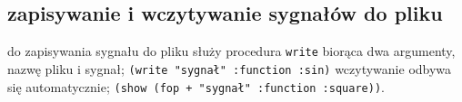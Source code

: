 \documentclass[12pt]{article}
\newcommand{\cljt}[1]{\texttt{#1}}
\begin{document}
\subsection{zapisywanie i wczytywanie sygnałów do pliku}
do zapisywania sygnału do pliku służy procedura \cljt{write} biorąca dwa argumenty, nazwę pliku i sygnał;
\cljt{(write "sygnał" {:function :sin})}
wczytywanie odbywa się automatycznie;
\cljt{(show (fop + "sygnał" {:function :square}))}.


\renewcommand\refname{Bibliografia}

%
\end{document}
